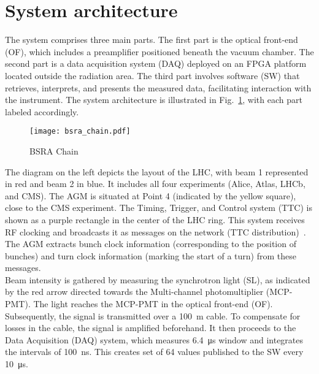\section{System architecture}
The system comprises three main parts. The first part is the optical front-end
(OF), which includes a preamplifier positioned beneath the vacuum chamber. The
second part is a data acquisition system (DAQ) deployed on an FPGA platform
located outside the radiation area. The third part involves software (SW) that
retrieves, interprets, and presents the measured data, facilitating interaction
with the instrument. The system architecture is illustrated in
Fig.~\ref{fig:bsra_chain}, with each part labeled accordingly.
\begin{figure}[!tbh]
    \centering
    \texttt{[image: bsra\_chain.pdf]}
    \caption{BSRA Chain}
    \label{fig:bsra_chain}
\end{figure} 
The diagram on the left depicts the layout of the LHC, with beam 1 represented
in red and beam 2 in blue. It includes all four experiments (Alice, Atlas,
LHCb, and CMS). The AGM is situated at Point 4 (indicated by the yellow
square), close to the CMS experiment. The Timing, Trigger, and Control system
(TTC) is shown as a purple rectangle in the center of the LHC ring. This system
receives RF clocking and broadcasts it as messages on the network (TTC
distribution)~\cite{ttc_distribution}. The AGM extracts bunch clock information
(corresponding to the position of bunches) and turn clock information (marking
the start of a turn) from these messages.\\
Beam intensity is gathered by measuring the synchrotron light (SL), as
indicated by the red arrow directed towards the Multi-channel photomultiplier
(MCP-PMT). The light reaches the MCP-PMT in the optical front-end (OF).
Subsequently, the signal is transmitted over a \SI{100}{m} cable. To compensate
for losses in the cable, the signal is amplified beforehand. It then proceeds
to the Data Acquisition (DAQ) system, which measures \SI{6.4}{\micro\second}
window and integrates the intervals of \SI{100}{\nano\second}. This creates set
of 64 values published to the SW every \SI{10}{\micro\second}.

